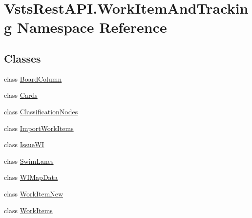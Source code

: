 \hypertarget{namespace_vsts_rest_a_p_i_1_1_work_item_and_tracking}{}\section{Vsts\+Rest\+A\+P\+I.\+Work\+Item\+And\+Tracking Namespace Reference}
\label{namespace_vsts_rest_a_p_i_1_1_work_item_and_tracking}
\subsection*{Classes}
\begin{DoxyCompactItemize}
\item 
class \mbox{\hyperlink{class_vsts_rest_a_p_i_1_1_work_item_and_tracking_1_1_board_column}{Board\+Column}}
\item 
class \mbox{\hyperlink{class_vsts_rest_a_p_i_1_1_work_item_and_tracking_1_1_cards}{Cards}}
\item 
class \mbox{\hyperlink{class_vsts_rest_a_p_i_1_1_work_item_and_tracking_1_1_classification_nodes}{Classification\+Nodes}}
\item 
class \mbox{\hyperlink{class_vsts_rest_a_p_i_1_1_work_item_and_tracking_1_1_import_work_items}{Import\+Work\+Items}}
\item 
class \mbox{\hyperlink{class_vsts_rest_a_p_i_1_1_work_item_and_tracking_1_1_issue_w_i}{Issue\+WI}}
\item 
class \mbox{\hyperlink{class_vsts_rest_a_p_i_1_1_work_item_and_tracking_1_1_swim_lanes}{Swim\+Lanes}}
\item 
class \mbox{\hyperlink{class_vsts_rest_a_p_i_1_1_work_item_and_tracking_1_1_w_i_map_data}{W\+I\+Map\+Data}}
\item 
class \mbox{\hyperlink{class_vsts_rest_a_p_i_1_1_work_item_and_tracking_1_1_work_item_new}{Work\+Item\+New}}
\item 
class \mbox{\hyperlink{class_vsts_rest_a_p_i_1_1_work_item_and_tracking_1_1_work_items}{Work\+Items}}
\end{DoxyCompactItemize}
